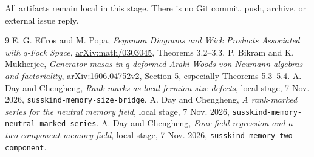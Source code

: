 \documentclass[11pt]{article}
\begin{document}
All artifacts remain local in this stage. There is no Git commit,
push, archive, or external issue reply.

\newpage
\begin{thebibliography}{9}\small
{} E. G. Effros and M. Popa, \emph{Feynman Diagrams and Wick
Products Associated with $q$-Fock Space},
\href{https://arxiv.org/abs/math/0303045}{arXiv:math/0303045},
Theorems 3.2--3.3.
 P. Bikram and K. Mukherjee, \emph{Generator masas in
$q$-deformed Araki-Woods von Neumann algebras and factoriality},
\href{https://arxiv.org/abs/1606.04752}{arXiv:1606.04752v2},
Section 5, especially Theorems 5.3--5.4.
 A. Day and Chengheng, \emph{Rank marks as local
fermion-size defects}, local stage, 7 Nov. 2026,
\texttt{susskind-memory-size-bridge}.
 A. Day and Chengheng, \emph{A rank-marked series for
the neutral memory field}, local stage, 7 Nov. 2026,
\texttt{susskind-memory-neutral-marked-series}.
 A. Day and Chengheng, \emph{Four-field regression and a
two-component memory field}, local stage, 7 Nov. 2026,
\texttt{susskind-memory-two-component}.
\end{thebibliography}
\end{document}
